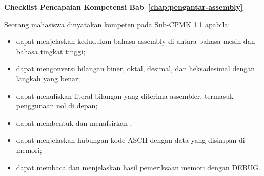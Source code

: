 \begin{checklistbox}
\vspace{1.1em}
\textbf{Checklist Pencapaian Kompetensi
Bab~\ref{chap:pengantar-assembly}}

Seorang mahasiswa dinyatakan kompeten pada Sub-CPMK 1.1 apabila:
\begin{itemize}
    \item[\checked] dapat menjelaskan kedudukan bahasa assembly di
          antara bahasa mesin dan bahasa tingkat tinggi;
    \item[\checked] dapat mengonversi bilangan biner, oktal, desimal,
          dan heksadesimal dengan langkah yang benar;
    \item[\checked] dapat menuliskan literal bilangan yang diterima
          assembler, termasuk penggunaan nol di depan;
    \item[\checked] dapat membentuk dan menafsirkan
          ;
    \item[\checked] dapat menjelaskan hubungan kode ASCII dengan data
          yang disimpan di memori;
    \item[\checked] dapat membaca dan menjelaskan hasil pemeriksaan
          memori dengan DEBUG.
\end{itemize}
\end{checklistbox}
